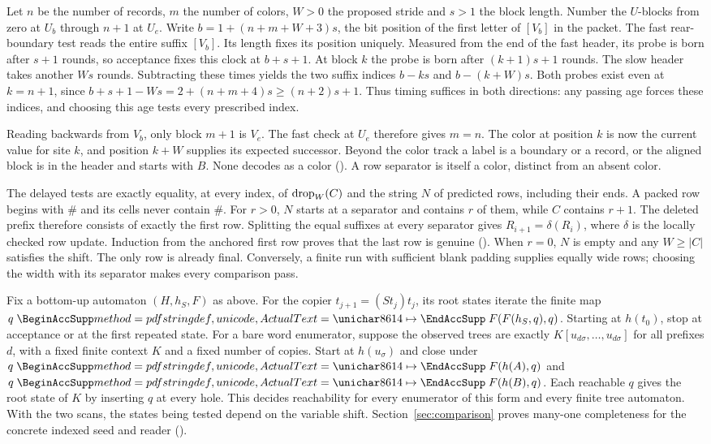 Let $n$ be the number of records, $m$ the number of colors, $W>0$ the
proposed stride and $s>1$ the block length. Number the $U$-blocks from
zero at $U_b$ through $n+1$ at $U_e$. Write
$b=1+(n+m+W+3)s$, the bit position of the first letter of $[V_b]$ in
the packet. The fast rear-boundary test reads the entire suffix $[V_b]$.
Its length fixes its position uniquely. Measured from the end of the
fast header, its probe is born after $s+1$ rounds, so acceptance fixes
this clock at $b+s+1$. At block $k$ the probe is born after
$(k+1)s+1$ rounds. The slow header takes another $Ws$ rounds. Subtracting
these times yields the two suffix indices $b-ks$ and $b-(k+W)s$.
Both probes exist even at $k=n+1$, since
$b+s+1-Ws=2+(n+m+4)s\ge(n+2)s+1$.
Thus timing suffices in both directions: any passing age forces these
indices, and choosing this age tests every prescribed index.

Reading backwards from $V_b$, only block $m+1$ is $V_e$.
The fast check at $U_e$ therefore gives $m=n$. The color at position
$k$ is now the current value for site $k$, and position $k+W$ supplies
its expected successor. Beyond the color track a label is a boundary
or a record, or the aligned block is in the header and starts with $B$.
None decodes as a color (). A row separator is
itself a color, distinct from an absent color.

The delayed tests are exactly equality, at every index, of
$\operatorname{drop}_W(C)$ and the string $N$ of predicted rows, including their ends.
A packed row begins with $\#$ and its cells never contain $\#$.
For $r>0$, $N$ starts at a separator and contains $r$ of them, while $C$
contains $r+1$. The deleted prefix therefore consists of exactly the first
row. Splitting the equal suffixes at every separator gives
$R_{i+1}=\delta(R_i)$, where $\delta$ is the locally checked row update.
Induction from the anchored first row proves that the last row is genuine
(). When $r=0$, $N$ is empty and any
$W\ge|C|$ satisfies the shift. The only row is already final. Conversely,
a finite run with sufficient blank padding supplies equally wide rows;
choosing the width with its separator makes every comparison pass.

Fix a bottom-up automaton $(H,h_S,F)$ as above. For the copier
$t_{j+1}=(S t_j)t_j$, its root states iterate the finite map
$q\copymapsto F(F(h_S,q),q)$. Starting at $h(t_0)$, stop at acceptance or at
the first repeated state. For a bare word enumerator, suppose the observed
trees are exactly $K[u_{d\sigma},\ldots,u_{d\sigma}]$ for all prefixes
$d$, with a fixed finite context $K$ and a fixed number of copies.
Start at $h(u_\sigma)$ and close under $q\copymapsto F(h(A),q)$ and
$q\copymapsto F(h(B),q)$. Each reachable $q$ gives the root state of $K$
by inserting $q$ at every hole. This decides reachability for every
enumerator of this form and every finite tree automaton. With the two
scans, the states being tested depend on the variable shift.
Section~\ref{sec:comparison} proves many-one completeness for the
concrete indexed seed and reader ().
